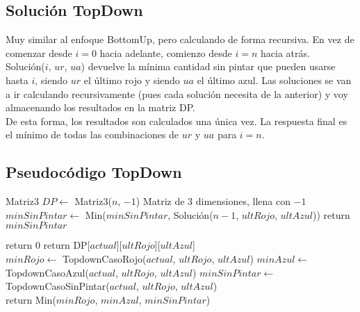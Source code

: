 \subsection{Solución TopDown}
Muy similar al enfoque BottomUp, pero calculando de forma recursiva. En vez de comenzar desde $i = 0$ hacia adelante, comienzo desde $i = n$ hacia atrás. \\

Solución($i$, $ur$, $ua$) devuelve la mínima cantidad sin pintar que pueden usarse hasta $i$, siendo $ur$ el último rojo y siendo $ua$ el último azul. Las soluciones se van a ir calculando recursivamente (pues cada solución necesita de la anterior) y voy almacenando los resultados en la matriz DP. \\

De esta forma, los resultados son calculados una única vez. La respuesta final es el mínimo de todas las combinaciones de $ur$ y $ua$ para $i = n$. \\


\subsection{Pseudocódigo TopDown}

\begin{algorithm}[H]
\begin{algorithmic}
  \State Matriz3 $DP \gets$ Matriz3($n$, $-1$) \Comment Matriz de 3 dimensiones, llena con $-1$
            \State $minSinPintar \gets$ Min($minSinPintar$, Solución($n-1$, $ultRojo$, $ultAzul$))
        \EndFor
    \EndFor
    \State return $minSinPintar$
\EndProcedure
\end{algorithmic}
\end{algorithm} 


\begin{algorithm}[H]
\begin{algorithmic}
        return $0$
    \EndIf
        return DP[$actual$][$ultRojo$][$ultAzul$]
    \EndIf \\

    \State $minRojo \gets$ TopdownCasoRojo($actual$, $ultRojo$, $ultAzul$)
    \State $minAzul \gets$ TopdownCasoAzul($actual$, $ultRojo$, $ultAzul$)
    \State $minSinPintar \gets$ TopdownCasoSinPintar($actual$, $ultRojo$, $ultAzul$) \\

    \State return Min($minRojo$, $minAzul$, $minSinPintar$)
\EndProcedure
\end{algorithmic}
\end{algorithm} 


